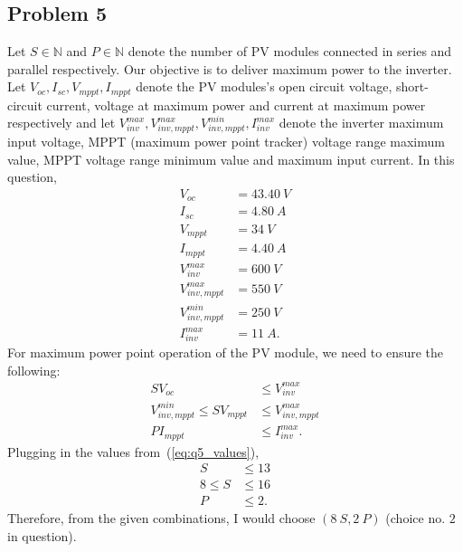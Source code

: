 \subsection*{Problem 5}
Let $S \in \mathbb{N}$ and $P\in \mathbb{N}$ denote the number of PV modules connected in series and parallel respectively. Our objective is to deliver maximum power to the inverter. Let $V_{oc}, I_{sc}, V_{mppt}, I_{mppt}$ denote the PV modules's open circuit voltage, short-circuit current, voltage at maximum power and current at maximum power respectively and let $V_{inv}^{max}, V_{inv,mppt}^{max}, V_{inv,mppt}^{min}, I_{inv}^{max}$ denote the inverter maximum input voltage, MPPT (maximum power point tracker) voltage range maximum value, MPPT voltage range minimum value and maximum input current. In this question,
\begin{align}\label{eq:q5_values}
	V_{oc} &= 43.40\ V \nonumber\\
	I_{sc} &= 4.80\ A \nonumber\\
	V_{mppt} &= 34\ V \nonumber\\
	I_{mppt} &= 4.40\ A \nonumber\\
	V_{inv}^{max} &= 600\ V \nonumber\\
	V_{inv, mppt}^{max} &= 550\ V \nonumber\\
	V_{inv, mppt}^{min} &= 250\ V \nonumber\\
	I_{inv}^{max} &= 11\ A.
\end{align}
For maximum power point operation of the PV module, we need to ensure the following:
\begin{align*}
	SV_{oc} &\leq V_{inv}^{max}\\
	V_{inv,mppt}^{min} \leq SV_{mppt} &\leq V_{inv,mppt}^{max}\\
	PI_{mppt} &\leq I_{inv}^{max}.
\end{align*}
Plugging in the values from~(\ref{eq:q5_values}),
\begin{align*}
	S &\leq 13\\
	8 \leq S &\leq 16\\
	P &\leq 2. 
\end{align*}
Therefore, from the given combinations, I would choose $(8\ S, 2\ P)$ (choice no. $2$ in question).